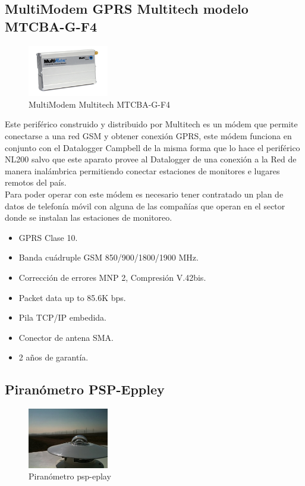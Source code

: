 \subsection{MultiModem GPRS Multitech modelo MTCBA-G-F4}

\begin{figure}[h!]
        \centering
        \includegraphics[width=100pt]{images/MultiModemGPRS}
        \caption{MultiModem Multitech MTCBA-G-F4} 
\end{figure}

Este periférico construido y distribuido por Multitech es un módem que permite conectarse a una red GSM y obtener conexión GPRS, este módem funciona en conjunto con el Datalogger Campbell de la misma forma que lo hace el periférico NL200 salvo que este aparato provee al Datalogger de una conexión a la Red de manera inalámbrica permitiendo conectar estaciones de monitores e lugares remotos del país.\\
Para poder operar con este módem es necesario tener contratado un plan de datos de telefonía móvil con alguna de las compañías que operan en el sector donde se instalan las estaciones de monitoreo.

\begin{itemize}
\item GPRS Clase 10.
\item Banda cuádruple GSM 850/900/1800/1900 MHz.
\item Corrección de errores MNP 2, Compresión V.42bis.
\item Packet data up to 85.6K bps.
\item Pila TCP/IP embedida.
\item Conector de antena SMA.
\item 2 años de garantía.
\end{itemize}

\subsection{Piranómetro PSP-Eppley}

\begin{figure}[h!]
        \centering
        \includegraphics[width=100pt]{images/piranometro}
        \caption{Piranómetro psp-eplay} 
\end{figure}

